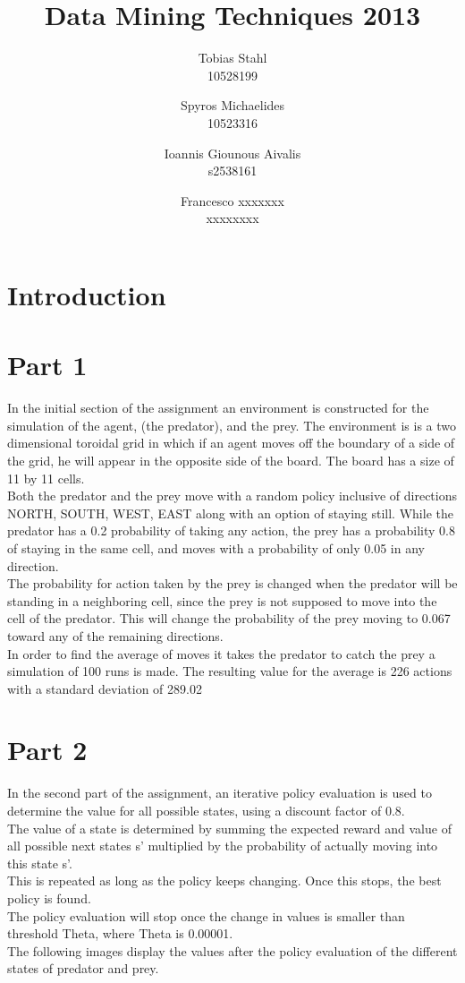 \documentclass[11pt]{article}
\title{
	\textbf{Data Mining Techniques 2013}
}
\author{Tobias Stahl \\ 10528199 \and Spyros Michaelides \\ 10523316 \and Ioannis Giounous Aivalis \\ s2538161 \and Francesco xxxxxxx \\ xxxxxxxx}
\date{}
\begin{document}
\maketitle

\section{Introduction}



\section{Part 1}

In the initial section of the assignment an environment is constructed for the simulation of the agent, (the predator), and the prey. The environment is is a two dimensional toroidal grid in which if an agent moves off the boundary of a side of the grid, he will appear in the opposite side of the board. The board has a size of 11 by 11 cells.\\
Both the predator and the prey move with a random policy inclusive of directions NORTH, SOUTH, WEST, EAST along with an option of staying still. While the predator has a 0.2 probability of taking any action, the prey has a probability 0.8 of staying in the same cell, and moves with a probability of only 0.05 in any direction.\\
The probability for action taken by the prey is changed when the predator will be standing in a neighboring cell, since the prey is not supposed to move into the cell of the predator. This will change the probability of the prey moving to 0.067 toward any of the remaining directions.\\
In order to find the average of moves it takes the predator to catch the prey a simulation of 100 runs is made. The resulting value for the average is 226 actions with a standard deviation of 289.02



\section{Part 2}

In the second part of the assignment, an iterative policy evaluation is used to determine the value for all possible states, using a discount factor of 0.8.\\
The value of a state is determined by summing the expected reward and value of all possible next states s' multiplied by the probability of actually moving into this state s'.\\
This is repeated as long as the policy keeps changing. Once this stops, the best policy is found.\\
The policy evaluation will stop once the change in values is smaller than threshold Theta, where Theta is 0.00001.\\
The following images display the values after the policy evaluation of the different states of predator and prey.
\end{document}
